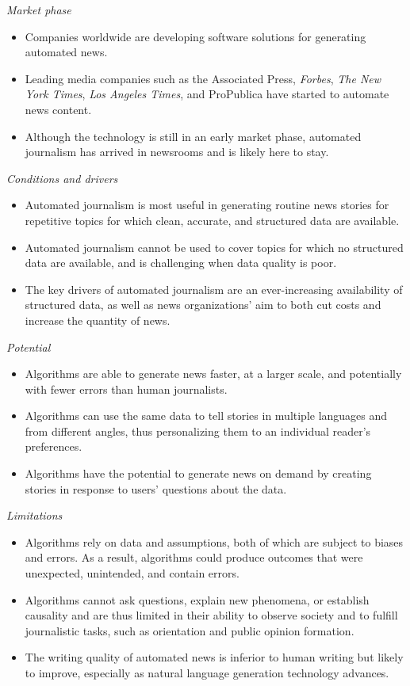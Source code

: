\documentclass[notoc, symmetric, nobib, nols]{towcenter-guideto-book}
\begin{document}
\textit{Market phase} 
\begin{itemize}
\item Companies worldwide are developing software solutions for generating automated news.
\item Leading media companies such as the Associated Press, \textit{Forbes}, \textit{The New York Times}, \textit{Los Angeles Times}, and ProPublica have started to automate news content.
\item Although the technology is still in an early market phase, automated journalism has arrived in newsrooms and is likely here to stay. 
\end{itemize}

\textit{Conditions and drivers}
\begin{itemize}
\item Automated journalism is most useful in generating routine news stories for repetitive topics for which clean, accurate, and structured data are available. 
\item Automated journalism cannot be used to cover topics for which no structured data are available, and is challenging when data quality is poor. 
\item The key drivers of automated journalism are an ever-increasing availability of structured data, as well as news organizations' aim to both cut costs and increase the quantity of news.
\end{itemize}

\textit{Potential}
\begin{itemize}
\item Algorithms are able to generate news faster, at a larger scale, and potentially with fewer errors than human journalists. 
\item Algorithms can use the same data to tell stories in multiple languages and from different angles, thus personalizing them to an individual reader's preferences. 
\item Algorithms have the potential to generate news on demand by creating stories in response to users' questions about the data.
\end{itemize}

\textit{Limitations}
\begin{itemize}
\item Algorithms rely on data and assumptions, both of which are subject to biases and errors. As a result, algorithms could produce outcomes that were unexpected, unintended, and contain errors. 
\item Algorithms cannot ask questions, explain new phenomena, or establish causality and are thus limited in their ability to observe society and to fulfill journalistic tasks, such as orientation and public opinion formation. 
\item The writing quality of automated news is inferior to human writing but likely to improve, especially as natural language generation technology advances.
\end{itemize}
\end{document}
